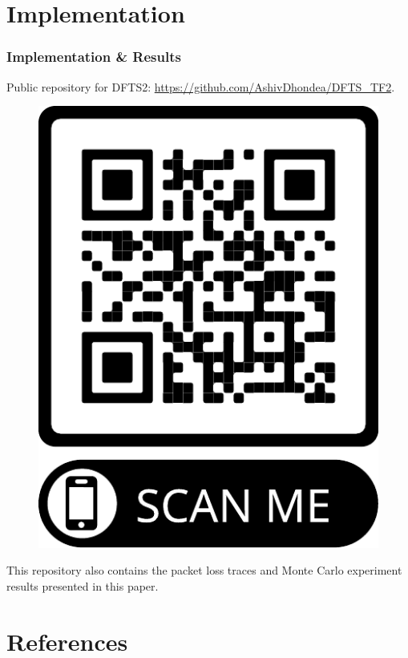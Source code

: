 \documentclass[aspectratio=169]{beamer}
\begin{document}
\section{Implementation}
\begin{frame}
\frametitle{Implementation \& Results}
Public repository for DFTS2: \url{https://github.com/AshivDhondea/DFTS_TF2}.

\begin{figure}[H]
    \centering
    \includegraphics[scale=0.35]{frame.pdf}
\end{figure}

This repository also contains the packet loss traces and Monte Carlo experiment results presented in this paper.
	\end{frame}
	
\section{References}


\end{document}
